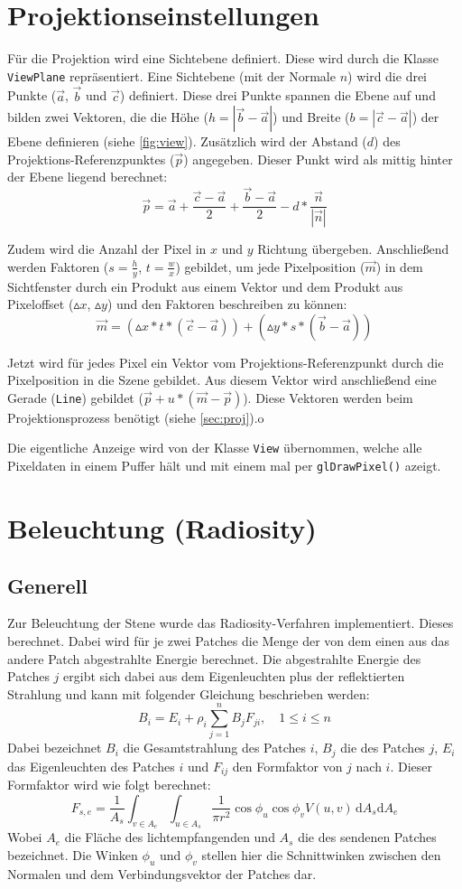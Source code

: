 \documentclass[final,a4paper,11pt,notitlepage,halfparskip]{scrreprt}
\begin{document}
\section{Projektionseinstellungen}
Für die Projektion wird eine Sichtebene definiert. Diese wird durch die Klasse
\texttt{ViewPlane} repräsentiert. Eine Sichtebene (mit der Normale $n$) wird die 
drei Punkte ($\vec{a}$, $\vec{b}$ und $\vec{c}$) definiert. Diese drei Punkte 
spannen die Ebene auf und bilden zwei Vektoren, die die Höhe ($h = |\vec{b} - 
\vec{a}|$) und Breite ($b = |\vec{c} - \vec{a}|$) der Ebene definieren (siehe
\ref{fig:view}). Zusätzlich wird der Abstand ($d$) des 
Projektions-Referenzpunktes ($\vec{p}$) angegeben. Dieser Punkt wird als mittig 
hinter der Ebene liegend berechnet:
$$\vec{p} = \vec{a} + \frac{\vec{c} - \vec{a}}{2} + \frac{\vec{b} - \vec{a}}{2}
- d * \frac{\vec{n}}{|\vec{n}|}$$

Zudem wird die Anzahl der Pixel in $x$ und $y$ Richtung übergeben. Anschließend 
werden Faktoren ($s = \frac{h}{y}$, $t = \frac{w}{x}$) gebildet, um jede 
Pixelposition ($\vec{m}$) in dem Sichtfenster durch ein Produkt aus einem Vektor 
und dem Produkt aus Pixeloffset ($\vartriangle x$, $\vartriangle y$) und den 
Faktoren beschreiben zu können:
$$\vec{m} = (\vartriangle x * t * (\vec{c} - \vec{a})) + (\vartriangle y * s * 
(\vec{b} - \vec{a}))$$

Jetzt wird für jedes Pixel ein Vektor vom Projektions-Referenzpunkt durch die
Pixelposition in die Szene gebildet. Aus diesem Vektor wird anschließend eine
Gerade (\texttt{Line}) gebildet ($\vec{p} + u * (\vec{m} - \vec{p})$). Diese
Vektoren werden beim Projektionsprozess benötigt (siehe \ref{sec:proj}).o

Die eigentliche Anzeige wird von der Klasse \texttt{View} übernommen, welche
alle Pixeldaten in einem Puffer hält und mit einem mal per 
\texttt{glDrawPixel()} azeigt.

\section{Beleuchtung (Radiosity)}
\subsection{Generell}
Zur Beleuchtung der Stene wurde das Radiosity-Verfahren implementiert. Dieses
berechnet. Dabei wird für je zwei Patches die Menge der von dem einen aus das
andere Patch abgestrahlte Energie berechnet. Die abgestrahlte Energie des
Patches $j$ ergibt sich dabei aus dem Eigenleuchten plus der reflektierten 
Strahlung und kann mit folgender Gleichung beschrieben werden:
$$B_i = E_i + \rho_i \sum_{j=1}^n B_jF_{ji},\quad 1 \le i \le n$$
Dabei bezeichnet $B_i$ die Gesamtstrahlung des Patches $i$, $B_j$ die des
Patches $j$, $E_i$ das Eigenleuchten des Patches $i$ und $F_{ij}$ den Formfaktor
von $j$ nach $i$. Dieser Formfaktor wird wie folgt berechnet:
$$F_{s,e} = \frac{1}{A_s}\int_{v\in A_e}\int_{u\in A_s} \frac{1}{\pi r^2} 
\cos\phi_u\cos\phi_v V(u,v) \,\mathrm dA_s \mathrm dA_e$$
Wobei $A_{e}$ die Fläche des lichtempfangenden und $A_s$ die des sendenen
Patches bezeichnet. Die Winken $\phi_u$ und $\phi_v$ stellen hier die
Schnittwinken zwischen den Normalen und dem Verbindungsvektor der Patches dar.
\end{document}
